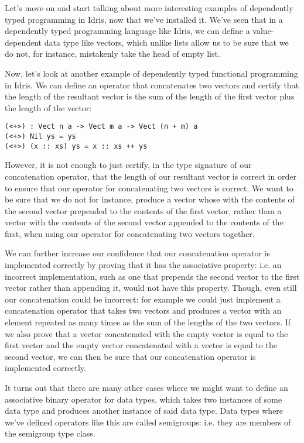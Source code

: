 Let's move on and start talking about more interesting examples of
dependently typed programming in Idris, now that we've installed it.
We've seen that in a dependently typed programming language like Idris,
we can define a value-dependent data type like vectors, which unlike lists
allow us to be sure that we do not, for instance, mistakenly take the
head of empty list.

Now, let's look at another example of dependently typed functional programming
in Idris. We can define an operator that concatenates two vectors and certify
that the length of the resultant vector is the sum of the length of the
first vector plus the length of the vector:

\begin{lstlisting}
(<+>) : Vect n a -> Vect m a -> Vect (n + m) a
(<+>) Nil ys = ys
(<+>) (x :: xs) ys = x :: xs ++ ys
\end{lstlisting}

However, it is not enough to just certify, in the type signature of our concatenation operator,
that the length of our resultant vector is correct in order to ensure that our operator
for concatenating two vectors is correct. We want to be sure that we do not for instance,
produce a vector whose with the contents of the second vector prepended to the contents of
the first vector, rather than a vector with the contents of the second vector appended to the
contents of the first, when using our operator for concatenating two vectors together.

We can further increase our confidence that our concatenation operator is implemented
correctly by proving that it has the associative property: i.e. an incorrect implementation, such as
one that prepends the second vector to the first vector rather than appending it, would
not have this property. Though, even still our concatenation could be incorrect: for
example we could just implement a concatenation operator that takes two vectors and
produces a vector with an element repeated as many times as the sum of the lengths of the
two vectors. If we also prove that a vector concatenated with the empty vector is equal
to the first vector and the empty vector concatenated with a vector is equal to the second
vector, we can then be sure that our concatenation operator is implemented correctly.

It turns out that there are many other cases where we might want to define an associative
binary operator for data types, which takes two instances of some data type and produces another
instance of said data type. Data types where we've defined operators like this are called
semigroups: i.e. they are members of the semigroup type class.
